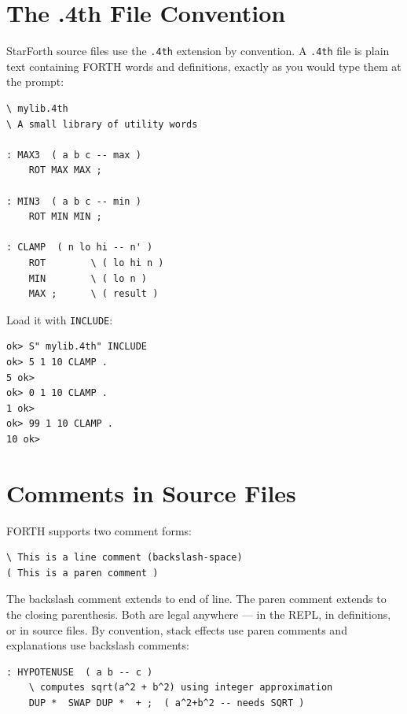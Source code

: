 \section{The .4th File Convention}
\label{sec:4th-files}

StarForth source files use the \texttt{.4th} extension by convention. A
\texttt{.4th} file is plain text containing FORTH words and definitions,
exactly as you would type them at the prompt:

\begin{lstlisting}[language=Forth]
\ mylib.4th
\ A small library of utility words

: MAX3  ( a b c -- max )
    ROT MAX MAX ;

: MIN3  ( a b c -- min )
    ROT MIN MIN ;

: CLAMP  ( n lo hi -- n' )
    ROT        \ ( lo hi n )
    MIN        \ ( lo n )
    MAX ;      \ ( result )
\end{lstlisting}

Load it with \texttt{INCLUDE}:

\begin{lstlisting}[language=Forth]
ok> S" mylib.4th" INCLUDE
ok> 5 1 10 CLAMP .
5 ok>
ok> 0 1 10 CLAMP .
1 ok>
ok> 99 1 10 CLAMP .
10 ok>
\end{lstlisting}

\section{Comments in Source Files}
\label{sec:comments}

FORTH supports two comment forms:

\begin{lstlisting}[language=Forth]
\ This is a line comment (backslash-space)
( This is a paren comment )
\end{lstlisting}

The backslash comment extends to end of line. The paren comment extends to the
closing parenthesis. Both are legal anywhere --- in the REPL, in definitions,
or in source files. By convention, stack effects use paren comments and
explanations use backslash comments:

\begin{lstlisting}[language=Forth]
: HYPOTENUSE  ( a b -- c )
    \ computes sqrt(a^2 + b^2) using integer approximation
    DUP *  SWAP DUP *  + ;  ( a^2+b^2 -- needs SQRT )
\end{lstlisting}


